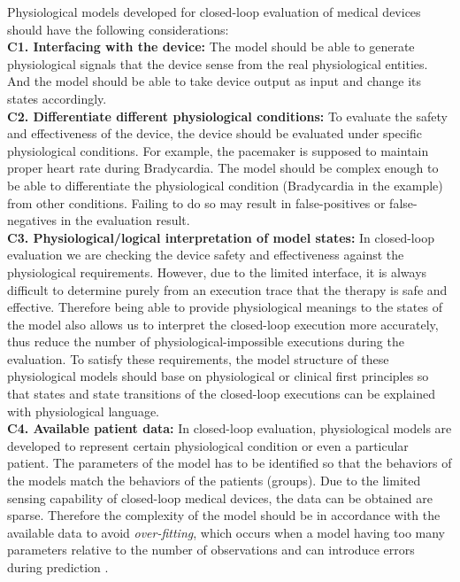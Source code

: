 Physiological models developed for closed-loop evaluation of medical devices should have the following considerations:\\
\textbf{C1. Interfacing with the device: }The model should be able to generate physiological signals that the device sense from the real physiological entities. And the model should be able to take device output as input and change its states accordingly. \\
\textbf{C2. Differentiate different physiological conditions: }To evaluate the safety and effectiveness of the device, the device should be evaluated under specific physiological conditions. For example, the pacemaker is supposed to maintain proper heart rate during Bradycardia. The model should be complex enough to be able to differentiate the physiological condition (Bradycardia in the example) from other conditions. Failing to do so may result in false-positives or false-negatives in the evaluation result. \\
\textbf{C3. Physiological/logical interpretation of model states: } In closed-loop evaluation we are checking the device safety and effectiveness against the physiological requirements. However, due to the limited interface, it is always difficult to determine purely from an execution trace that the therapy is safe and effective. Therefore being able to provide physiological meanings to the states of the model also allows us to interpret the closed-loop execution more accurately, thus reduce the number of physiological-impossible executions during the evaluation. To satisfy these requirements, the model structure of these physiological models should base on physiological or clinical first principles so that states and state transitions of the closed-loop executions can be explained with physiological language. \\%
\textbf{C4. Available patient data: } In closed-loop evaluation, physiological models are developed to represent certain physiological condition or even a particular patient. The parameters of the model has to be identified so that the behaviors of the models match the behaviors of the patients (groups).  Due to the limited sensing capability of closed-loop medical devices, the data can be obtained are sparse. Therefore the complexity of the model should be in accordance with the available data to avoid \emph{over-fitting}, which occurs when a model having too many parameters relative to the number of observations and can introduce errors during prediction .

